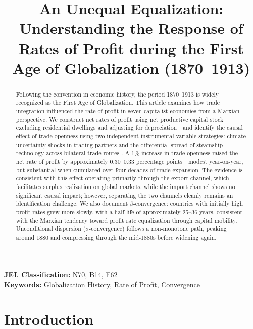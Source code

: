 \documentclass[10pt]{article}
\begin{document}
\title{\textcolor{blue!60!black}{An Unequal Equalization: Understanding the Response of Rates of Profit during the First Age of Globalization (1870--1913)}}
\date{}
\maketitle

\begin{abstract}
Following the convention in economic history, the period 1870--1913 is widely recognized as the First Age of Globalization. This article examines how trade integration influenced the rate of profit in seven capitalist economies from a Marxian perspective. We construct net rates of profit using net productive capital stock---excluding residential dwellings and adjusting for depreciation---and identify the causal effect of trade openness using two independent instrumental variable strategies: climate uncertainty shocks in trading partners and the differential spread of steamship technology across bilateral trade routes \citep{Pascali2017}. A 1\% increase in trade openness raised the net rate of profit by approximately 0.30--0.33 percentage points---modest year-on-year, but substantial when cumulated over four decades of trade expansion. The evidence is consistent with this effect operating primarily through the export channel, which facilitates surplus realization on global markets, while the import channel shows no significant causal impact; however, separating the two channels cleanly remains an identification challenge. We also document $\beta$-convergence: countries with initially high profit rates grew more slowly, with a half-life of approximately 25--36 years, consistent with the Marxian tendency toward profit rate equalization through capital mobility. Unconditional dispersion ($\sigma$-convergence) follows a non-monotone path, peaking around 1880 and compressing through the mid-1880s before widening again.
\end{abstract}

\textbf{JEL Classification:} N70, B14, F62 \\
\textbf{Keywords:} Globalization History, Rate of Profit, Convergence

\section{Introduction}
\label{sec:intro}
\end{document}
